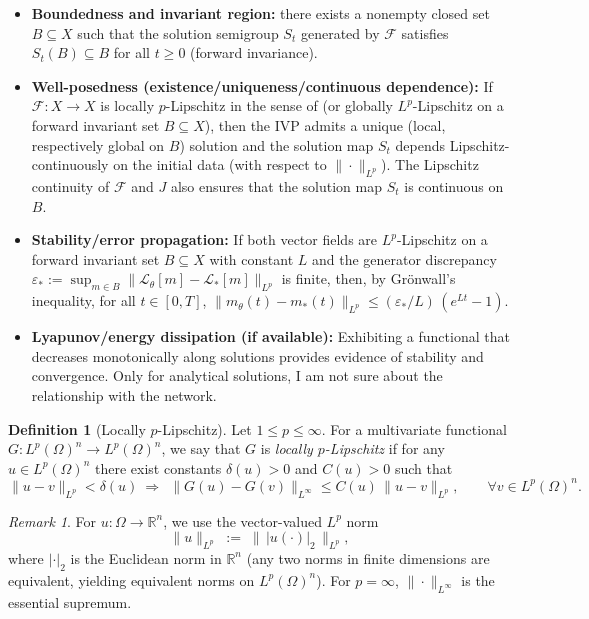 \documentclass[11pt,a4paper]{article}
\theoremstyle{plain}
\theoremstyle{definition}
\newtheorem{definition}[theorem]{Definition}
\theoremstyle{remark}
\newtheorem{remark}[theorem]{Remark}
\begin{document}
\begin{itemize}
	\item \textbf{Boundedness and invariant region:}
	      there exists a nonempty closed set $B\subseteq X$ such that the solution semigroup $S_t$ generated by $\mathcal{F}$ satisfies $S_t(B)\subseteq B$ for all $t\ge 0$ (forward invariance).

	\item \textbf{Well-posedness (existence/uniqueness/continuous dependence):}
	      If $\mathcal{F}:X\to X$ is locally $p$-Lipschitz in the sense of  (or globally $L^p$-Lipschitz on a forward invariant set $B\subseteq X$), then the IVP admits a unique (local, respectively global on $B$) solution and the solution map $S_t$ depends Lipschitz-continuously on the initial data (with respect to $\|\cdot\|_{L^p}$). The Lipschitz continuity of $\mathcal{F}$ and $J$ also ensures that the solution map $S_t$ is continuous on $B$.

	\item \textbf{Stability/error propagation:}
	      If both vector fields are $L^p$-Lipschitz on a forward invariant set $B\subseteq X$ with constant $L$ and the generator discrepancy $\varepsilon_*:=\sup_{m\in B}\|\mathcal{L}_\theta[m]-\mathcal{L}_*[m]\|_{L^p}$ is finite, then, by Grönwall's inequality, for all $t\in[0,T]$,
	      $\|m_\theta(t)-m_*(t)\|_{L^p} \le (\varepsilon_*/L)\,(e^{L t}-1)$.

	\item \textbf{Lyapunov/energy dissipation (if available):}
	      Exhibiting a functional that decreases monotonically along solutions provides evidence of stability and convergence. Only for analytical solutions, I am not sure about the relationship with the network.
\end{itemize}



\begin{definition}[Locally $p$-Lipschitz]\label{def:locally-p-Lip}
	Let $1\le p\le \infty$. For a multivariate functional $G: L^p(\Omega)^n \to L^p(\Omega)^n$, we say that $G$ is \emph{locally $p$-Lipschitz} if for any $u\in L^p(\Omega)^n$ there exist constants $\delta(u)>0$ and $C(u)>0$ such that
	\[
		\|u-v\|_{L^p} < \delta(u)
		\ \Longrightarrow\ \
		\|G(u)-G(v)\|_{L^{\infty}} \le C(u)\,\|u-v\|_{L^p},
		\qquad \forall v\in L^p(\Omega)^n.
	\]
\end{definition}

\begin{remark}
	For $u:\Omega\to\mathbb{R}^n$, we use the vector-valued $L^p$ norm
	\[
		\|u\|_{L^p} \;:=\; \big\|\, |u(\cdot)|_2 \,\big\|_{L^p},
	\]
	where $|\cdot|_2$ is the Euclidean norm in $\mathbb{R}^n$ (any two norms in finite dimensions are equivalent, yielding equivalent norms on $L^p(\Omega)^n$). For $p=\infty$, $\|\cdot\|_{L^{\infty}}$ is the essential supremum.
\end{remark}
\end{document}
